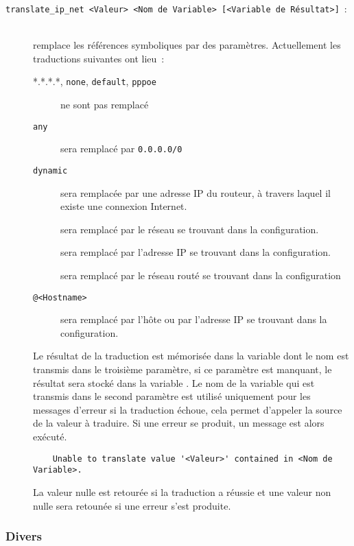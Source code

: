 \begin{description}

\item[\texttt{translate\_ip\_net <Valeur> <Nom de Variable> [<Variable de Résultat>]}~:]\mbox{}\\
remplace les références symboliques par des paramètres. Actuellement les traductions
suivantes ont lieu~:
\begin{description}
\item[*.*.*.*, \texttt{none}, \texttt{default}, \texttt{pppoe}] ne sont pas remplacé
\item[\texttt{any}] sera remplacé par \texttt{0.0.0.0/0}
\item[\texttt{dynamic}] sera remplacée par une adresse IP du routeur, à travers laquel
il existe une connexion Internet.
\item[] sera remplacé par le réseau se trouvant dans la configuration.
\item[] sera remplacé par l'adresse IP se trouvant dans
la configuration.
\item[] sera remplacé par le réseau routé se trouvant dans la configuration
\item[\texttt{@<Hostname>}] sera remplacé par l'hôte ou par l'adresse IP se trouvant dans
la configuration.
\end{description}

Le résultat de la traduction est mémorisée dans la variable dont le nom est transmis dans
le troisième paramètre, si ce paramètre est manquant, le résultat sera stocké dans la variable 
. Le nom de la variable qui est transmis dans le second paramètre est utilisé
uniquement pour les messages d'erreur si la traduction échoue, cela permet d'appeler la source
de la valeur à traduire. Si une erreur se produit, un message est alors exécuté.

\begin{example}
\begin{verbatim}
    Unable to translate value '<Valeur>' contained in <Nom de Variable>.
\end{verbatim}
\end{example}

La valeur nulle est retourée si la traduction a réussie et une valeur non nulle sera retounée
si une erreur s'est produite.

\end{description}


\subsubsection{Divers}

